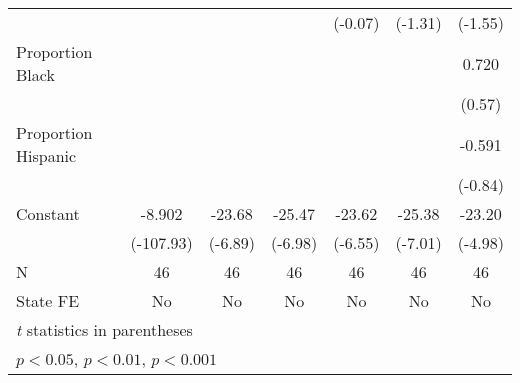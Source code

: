 {\begin{tabular}{l*{6}{c}}
                    &                     &                     &                     &     (-0.07)         &     (-1.31)         &     (-1.55)         \\
\addlinespace
Proportion Black    &                     &                     &                     &                     &                     &       0.720         \\
                    &                     &                     &                     &                     &                     &      (0.57)         \\
\addlinespace
Proportion Hispanic &                     &                     &                     &                     &                     &      -0.591         \\
                    &                     &                     &                     &                     &                     &     (-0.84)         \\
\addlinespace
Constant            &      -8.902\sym{***}&      -23.68\sym{***}&      -25.47\sym{***}&      -23.62\sym{***}&      -25.38\sym{***}&      -23.20\sym{***}\\
                    &   (-107.93)         &     (-6.89)         &     (-6.98)         &     (-6.55)         &     (-7.01)         &     (-4.98)         \\
\midrule
N                   &          46         &          46         &          46         &          46         &          46         &          46         \\
State FE            &          No         &          No         &          No         &          No         &          No         &          No         \\
\bottomrule
\multicolumn{7}{l}{\footnotesize \textit{t} statistics in parentheses}\\
\multicolumn{7}{l}{\footnotesize \sym{*} \(p<0.05\), \sym{**} \(p<0.01\), \sym{***} \(p<0.001\)}\\
\end{tabular}
}
